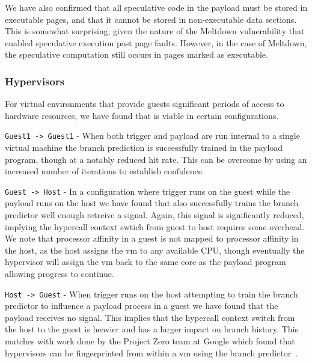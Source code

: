 We have also confirmed that all speculative code in the payload must be
stored in executable pages, and that it cannot be stored in non-executable data
sections. This is somewhat surprising, given the nature of the Meltdown
vulnerability that enabled speculative execution past page faults. However, in
the case of Meltdown, the speculative computation still occurs in pages marked
as executable.



\subsubsection{Hypervisors}
For virtual environments that provide guests significant periods of access to 
hardware resources, we have found that \speculake is viable in certain configurations. 

\texttt{Guest1 -> Guest1} - When both trigger and payload are run internal to
a single virtual machine the branch prediction is successfully trained in the payload
program, though at a notably reduced hit rate. This can be overcome by using an 
increased number of iterations to establish confidence. 

\texttt{Guest -> Host} - In a configuration where trigger runs on the guest while the 
payload runs on the host we have found that \speculake also successfully trains the 
branch predictor well enough retreive a signal. Again, this signal is significantly
reduced, implying the hypercall context swtich from guest to host requires some 
overhead. We note that processor affinity in a guest is not mapped to processor 
affinity in the host, as the host assigns the vm to any available CPU, though 
eventually the hypervisor will assign the vm back to the same core as the payload 
program allowing progress to continue.

\texttt{Host -> Guest} - When trigger runs on the host attempting to train the 
branch predictor to influence a payload process in a guest we have found that 
the payload receives no signal. This implies that the hypercall context switch 
from the host to the guest is heavier and has a larger impact on branch history. 
This matches with work done by the Project Zero team at Google which found that 
hypervisors can be fingerprinted from within a vm using the branch 
predictor~\cite{project_zero}.

